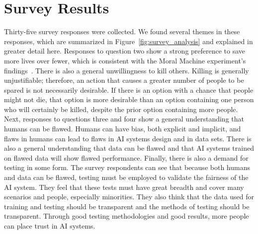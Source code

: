 \documentclass[]{report}
\begin{document}
\FloatBarrier
\section{Survey Results}

Thirty-five survey responses were collected. We found several themes in these responses, which are
summarized in Figure~\ref{fig:survey_analysis} and explained in greater detail here. Responses to
question two show a strong preference to save more lives over fewer, which is consistent with the
Moral Machine experiment's findings~\cite{awad2018moral}. There is also a general unwillingness to
kill others. Killing is generally unjustifiable; therefore, an action that causes a greater number
of people to be spared is not necessarily desirable. If there is an option with a chance that people
might not die, that option is more desirable than an option containing one person who will certainly
be killed, despite the prior option containing more people. Next, responses to questions three and
four show a general understanding that humans can be flawed. Humans can have bias, both explicit and
implicit, and flaws in humans can lead to flaws in AI systems design and in data sets. There is also
a general understanding that data can be flawed and that AI systems trained on flawed data will show
flawed performance. Finally, there is also a demand for testing in some form. The survey respondents
can see that because both humans and data can be flawed, testing must be employed to validate the
fairness of the AI system. They feel that these tests must have great breadth and cover many
scenarios and people, especially minorities. They also think that the data used for training and
testing should be transparent and the methods of testing should be transparent. Through good testing
methodologies and good results, more people can place trust in AI systems.
\end{document}
